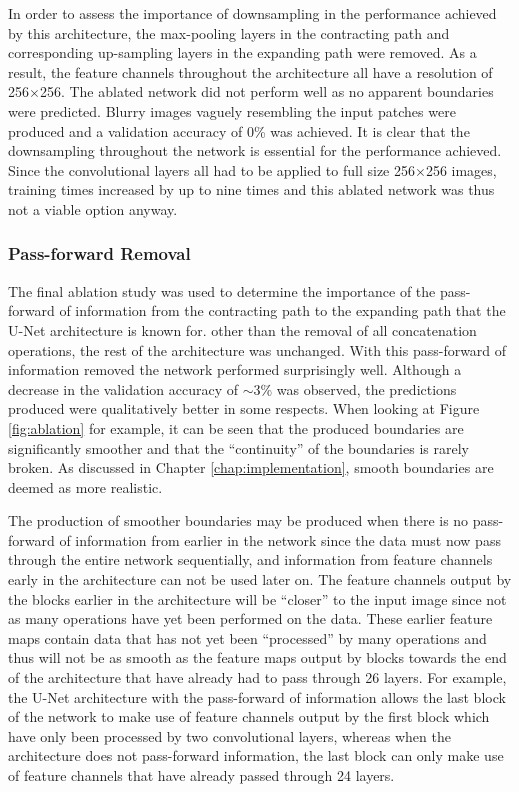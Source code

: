 In order to assess the importance of downsampling in the performance achieved by this architecture, the max-pooling layers in the contracting path and corresponding up-sampling layers in the expanding path were removed. As a result, the feature channels throughout the architecture all have a resolution of 256$\times$256. The ablated network did not perform well as no apparent boundaries were predicted. Blurry images vaguely resembling the input patches were produced and a validation accuracy of 0\% was achieved. It is clear that the downsampling throughout the network is essential for the performance achieved. Since the convolutional layers all had to be applied to full size 256$\times$256 images, training times increased by up to nine times and this ablated network was thus not a viable option anyway.

\subsubsection{Pass-forward Removal}

The final ablation study was used to determine the importance of the pass-forward of information from the contracting path to the expanding path that the U-Net architecture is known for. other than the removal of all concatenation operations, the rest of the architecture was unchanged. With this pass-forward of information removed the network performed surprisingly well. Although a decrease in the validation accuracy of ${\sim}3\%$ was observed, the predictions produced were qualitatively better in some respects. When looking at Figure \ref{fig:ablation} for example, it can be seen that the produced boundaries are significantly smoother and that the ``continuity'' of the boundaries is rarely broken. As discussed in Chapter \ref{chap:implementation}, smooth boundaries are deemed as more realistic.

The production of smoother boundaries may be produced when there is no pass-forward of information from earlier in the network since the data must now pass through the entire network sequentially, and information from feature channels early in the architecture can not be used later on. The feature channels output by the blocks earlier in the architecture will be ``closer'' to the input image since not as many operations have yet been performed on the data. These earlier feature maps contain data that has not yet been ``processed'' by many operations and thus will not be as smooth as the feature maps output by blocks towards the end of the architecture that have already had to pass through 26 layers. For example, the U-Net architecture with the pass-forward of information allows the last block of the network to make use of feature channels output by the first block which have only been processed by two convolutional layers, whereas when the architecture does not pass-forward information, the last block can only make use of feature channels that have already passed through 24 layers.

